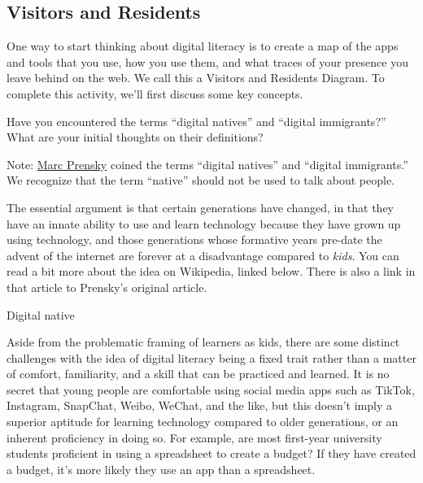 \documentclass[
  letterpaper,
  DIV=11,
  numbers=noendperiod]{scrreprt}
\begin{document}
\subsection{Visitors and Residents}\label{visitors-and-residents}

One way to start thinking about digital literacy is to create a map of
the apps and tools that you use, how you use them, and what traces of
your presence you leave behind on the web. We call this a Visitors and
Residents Diagram. To complete this activity, we'll first discuss some
key concepts.

Have you encountered the terms ``digital natives'' and ``digital
immigrants?'' What are your initial thoughts on their definitions?

\begin{tcolorbox}[enhanced jigsaw, toprule=.15mm, colback=white, colframe=quarto-callout-note-color-frame, arc=.35mm, opacityback=0, breakable, rightrule=.15mm, bottomrule=.15mm, leftrule=.75mm, left=2mm]
\begin{minipage}[t]{5.5mm}
\textcolor{quarto-callout-note-color}{\faInfo}
\end{minipage}%
\begin{minipage}[t]{\textwidth - 5.5mm}

Note: \href{https://marcprensky.com/}{Marc Prensky} coined the terms
``digital natives'' and ``digital immigrants.'' We recognize that the
term ``native'' should not be used to talk about people.

\end{minipage}%
\end{tcolorbox}

The essential argument is that certain generations have changed, in that
they have an innate ability to use and learn technology because they
have grown up using technology, and those generations whose formative
years pre-date the advent of the internet are forever at a disadvantage
compared to \emph{kids}. You can read a bit more about the idea on
Wikipedia, linked below. There is also a link in that article to
Prensky's original article.

Digital native

Aside from the problematic framing of learners as kids, there are some
distinct challenges with the idea of digital literacy being a fixed
trait rather than a matter of comfort, familiarity, and a skill that can
be practiced and learned. It is no secret that young people are
comfortable using social media apps such as TikTok, Instagram, SnapChat,
Weibo, WeChat, and the like, but this doesn't imply a superior aptitude
for learning technology compared to older generations, or an inherent
proficiency in doing so. For example, are most first-year university
students proficient in using a spreadsheet to create a budget? If they
have created a budget, it's more likely they use an app than a
spreadsheet.
\end{document}
